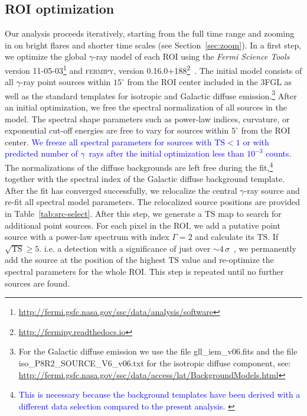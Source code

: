 \documentclass[twocolumn,linenumbers]{aastex62}
\newcommand{\Grays}{$\gamma$~rays\xspace}
\newcommand{\gray}{$\gamma$-ray\xspace}
\newcommand{\response}[1]{\textcolor{blue}{#1}}
\begin{document}
\subsection{ROI optimization}
\label{sec:roi}

Our analysis proceeds iteratively, starting from the full time range and zooming in on bright flares and shorter time scales (see Section~\ref{sec:zoom}).
In a first step, we optimize the global \gray model of each ROI using the \textit{Fermi Science Tools} version 11-05-03\footnote{\url{http://fermi.gsfc.nasa.gov/ssc/data/analysis/software}} and \textsc{fermipy}, version 0.16.0+188\footnote{\url{http://fermipy.readthedocs.io}}~\citep{fermipy}.
The initial model consists of all \gray point sources within $15^\circ$ from the ROI center included in the 3FGL as well as the standard templates for isotropic and Galactic diffuse emission.\footnote{For the Galactic diffuse emission we use the file gll\_iem\_v06.fits and the file iso\_P8R2\_SOURCE\_V6\_v06.txt for the isotropic diffuse component, see: \url{ http://fermi.gsfc.nasa.gov/ssc/data/access/lat/BackgroundModels.html}}
After an initial optimization, we free the spectral normalization of all sources in the model. 
The spectral shape parameters such as power-law indices, curvature, or exponential cut-off energies are free to vary for sources within $5^\circ$ from the ROI center. 
\response{
We freeze all spectral parameters for sources with $\mathrm{TS} < 1$ or with predicted number of \Grays after the initial optimization less than $10^{-3}$ counts.}
The normalizations of the diffuse backgrounds are left free during the fit,\footnote{
\response{
This is necessary because the background templates have been derived with a different data selection compared to the present analysis.
} 
}
together with the spectral index of the Galactic diffuse background template.
After the fit has converged successfully, 
we relocalize the central \gray source and re-fit all spectral model parameters. The relocalized source positions are provided in Table~\ref{tab:src-select}.
After this step, we generate a $\mathrm{TS}$ map to search for additional point sources. For each pixel in the ROI, we add a putative point source with a power-law spectrum with index $\Gamma = 2$ and calculate its $\mathrm{TS}$. If  $\sqrt{\mathrm{TS}} \geqslant 5$. i.e.  a detection with a significance of just over $\sim 4\,\sigma$~\citep{3fgl}, we permanently add the source at the position of the highest $\mathrm{TS}$ value and re-optimize the spectral parameters for the whole ROI. This step is repeated until no further sources are found.
\end{document}
